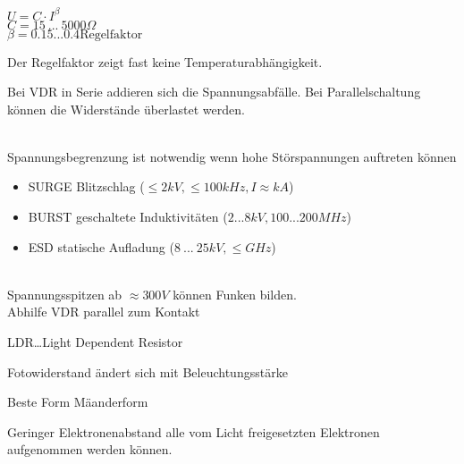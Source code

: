 \documentclass[letterpaper,10pt,english]{jupyterBook}
\begin{document}
\sphinxAtStartPar
\(U = C\cdot I^{\beta}\)\\
\(C = 15~ ...~ 5000\Omega\)\\
\(\beta = 0.15...0.4 \text{Regelfaktor}\)

\sphinxAtStartPar
Der Regelfaktor zeigt fast keine Temperaturabhängigkeit.

\sphinxAtStartPar
Bei VDR in Serie addieren sich die Spannungsabfälle.
Bei Parallelschaltung können die Widerstände überlastet werden.

\sphinxAtStartPar
{}\\
Spannungsbegrenzung ist notwendig wenn hohe Störspannungen auftreten können
\begin{itemize}
\item {} 
\sphinxAtStartPar
SURGE \sphinxhyphen{} Blitzschlag (\(\leq 2kV, \leq 100kHz, I\approx kA\))

\item {} 
\sphinxAtStartPar
BURST \sphinxhyphen{} geschaltete Induktivitäten (\(2...8 kV, 100...200 MHz\))

\item {} 
\sphinxAtStartPar
ESD \sphinxhyphen{} statische Aufladung (\(8~...~25 kV, \leq GHz\))

\end{itemize}

\sphinxAtStartPar
{}\\
Spannungsspitzen ab \(\approx 300V\) können Funken bilden.\\
Abhilfe VDR parallel zum Kontakt

\begin{DUlineblock}{0em}
\item[] 
\end{DUlineblock}

\sphinxAtStartPar
LDR…Light Dependent Resistor

\sphinxAtStartPar
Fotowiderstand ändert sich mit Beleuchtungsstärke

\sphinxAtStartPar
Beste Form Mäanderform

\sphinxAtStartPar
Geringer Elektronenabstand alle vom Licht freigesetzten Elektronen aufgenommen werden können.

\begin{DUlineblock}{0em}
\item[] 
\end{DUlineblock}
\end{document}

